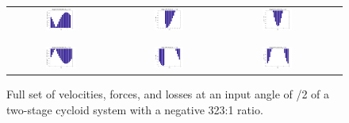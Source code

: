 \begin{figure}[h]
   \centering
   \begin{tabular}{cccc}
	   \includegraphics[width=0.30\textwidth]{fig/double_1_neg_vel_pi_2} &
	   \includegraphics[width=0.30\textwidth]{fig/double_1_neg_forces_pi_2} &
	   \includegraphics[width=0.30\textwidth]{fig/double_1_neg_losses_pi_2} \\
	   \\
	   \hline
	   \\
	   \includegraphics[width=0.30\textwidth]{fig/double_2_neg_vel_pi_2} &
	   \includegraphics[width=0.30\textwidth]{fig/double_2_neg_forces_pi_2} &
	   \includegraphics[width=0.30\textwidth]{fig/double_2_neg_losses_pi_2} \\
   \end{tabular}
   \caption{Full set of velocities, forces, and losses at an input angle of \textpi/2 of a two-stage cycloid system with a negative 323:1 ratio.}
   \label{fig:two_stage_forces_neg}
\end{figure}

